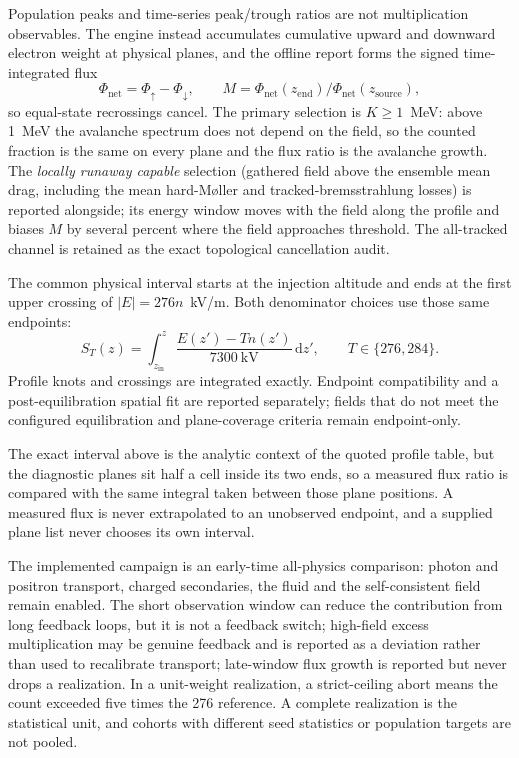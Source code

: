 \documentclass[11pt]{article}
\begin{document}
Population peaks and time-series peak/trough ratios are not multiplication
observables.  The engine instead accumulates cumulative upward and downward
electron weight at physical planes, and the offline report forms the signed
time-integrated flux
\[
  \Phi_{\mathrm{net}}=\Phi_{\uparrow}-\Phi_{\downarrow},
  \qquad M=\Phi_{\mathrm{net}}(z_{\mathrm{end}})/
              \Phi_{\mathrm{net}}(z_{\mathrm{source}}),
\]
so equal-state recrossings cancel.  The primary selection is $K\geq1$~MeV:
above 1~MeV the avalanche spectrum does not depend on the field, so the counted
fraction is the same on every plane and the flux ratio is the avalanche growth.
The \emph{locally runaway capable} selection (gathered field above the ensemble
mean drag, including the mean hard-M{\o}ller and tracked-bremsstrahlung
losses) is reported alongside; its energy window moves with the field along
the profile and biases $M$ by several percent where the field approaches
threshold.  The all-tracked channel is retained as the exact topological
cancellation audit.

The common physical interval starts at the injection altitude and ends at the
first upper crossing of $|E|=276n$~kV/m.  Both denominator choices use those
same endpoints:
\[
 S_T(z)=\int_{z_{\mathrm{in}}}^{z}
       \frac{E(z')-Tn(z')}{7300~\mathrm{kV}}\,\mathrm{d}z',
 \qquad T\in\{276,284\}.
\]
Profile knots and crossings are integrated exactly.  Endpoint compatibility
and a post-equilibration spatial fit are reported separately; fields that do
not meet the configured equilibration and plane-coverage criteria remain
endpoint-only.

The exact interval above is the analytic context of the quoted profile table,
but the diagnostic planes sit half a cell inside its two ends, so a measured
flux ratio is compared with the same integral taken between those plane
positions.  A measured flux is never extrapolated to an unobserved endpoint,
and a supplied plane list never chooses its own interval.

The implemented campaign is an early-time all-physics comparison: photon and
positron transport, charged secondaries, the fluid and the self-consistent
field remain enabled. The short observation window can reduce the contribution
from long feedback loops, but it is not a feedback switch; high-field excess
multiplication may be genuine feedback and is reported as a deviation rather
than used to recalibrate transport; late-window flux growth is reported but
never drops a realization. In a unit-weight realization, a strict-ceiling abort
means the count exceeded five times the 276 reference. A complete realization
is the statistical unit, and cohorts with different seed statistics or
population targets are not pooled.
\end{document}
